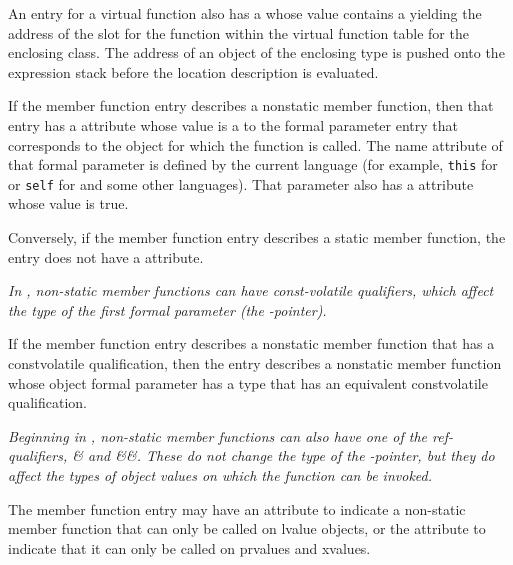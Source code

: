 An 
\hypertarget{chap:DWATvtableelemlocationvirtualfunctiontablevtableslot}{}
entry for a virtual function also has a
\DWATvtableelemlocation{}
 whose value contains
a  
yielding the address of the slot
for the function within the virtual function table for the
enclosing class. The address of an object of the enclosing
type is pushed onto the expression stack before the location
description is evaluated.

If 
\hypertarget{chap:DWATobjectpointerobjectthisselfpointerofmemberfunction}{}
the member function entry describes a non\dash static member
function, then that entry 
has 
a \DWATobjectpointer{} 
attribute
whose value is a  
to the formal parameter entry
that corresponds to the object for which the function is
called. The name attribute of that formal parameter is defined
by the current language (for example, 
\texttt{this} for  or \texttt{self}
for  
and some other languages). That parameter
also has a \DWATartificial{} attribute whose value is true.

Conversely, if the member function entry describes a static
member function, the entry does not have 
a 
\DWATobjectpointer{}
attribute.

\textit{In , non-static member functions can have const-volatile
qualifiers, which affect the type of the first formal parameter (the
-pointer).}
 
If the member function entry describes a non\dash static member
function that has a const\dash volatile qualification, then
the entry describes a non\dash static member function whose
object formal parameter has a type that has an equivalent
const\dash volatile qualification.

\textit{Beginning in , non-static member 
functions can also have one of the ref-qualifiers, \& and \&\&. 
These do not change the type of the
-pointer, but they do affect the types of 
object values on which the function can be invoked.}

The member function entry may have an \DWATreferenceNAME{} attribute
to indicate a non-static member function that can only be called on
lvalue objects, or the \DWATrvaluereferenceNAME{} attribute 
to indicate that it can only be called on prvalues and xvalues.

